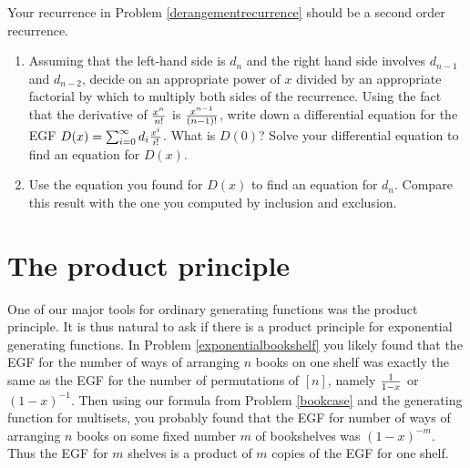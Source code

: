 \itemesi Your recurrence in  Problem \ref{derangementrecurrence}
should be a second order recurrence.\label{exponentialderangements}
\begin{enumerate}  
\item Assuming that the left-hand side is $d_n$ and the right hand side
involves $d_{n-1}$ and $d_{n-2}$, decide on an appropriate power of $x$
divided by an appropriate factorial by which to multiply both sides of
the recurrence.  Using the fact that the
derivative of $x^n\over n!$ is $x^{n-1}\over (n-1)!$, write down a
differential equation for the EGF $D(x) =
\sum_{i=0}^\infty d_i{x^i\over i!}$. What is $D(0)$?  Solve your
differential equation to find an equation for $D(x)$.
\item Use the equation you found for $D(x)$ to find an equation for
$d_n$.  Compare this result with the one you computed by inclusion and
exclusion. 
\end{enumerate}

\ep

\section{The product principle}  One of our major tools for ordinary
generating functions was the product principle.  It is thus natural to
ask if there is a product principle for exponential generating functions.
In Problem \ref{exponentialbookshelf} you likely found that the
EGF for the number of ways of arranging $n$
books on one shelf was exactly the same as the EGF for the number of
permutations of $[n]$, namely $1\over 1-x$ or
$(1-x)^{-1}$.  Then using our formula from Problem \ref{bookcase} and the
generating function for multisets, you probably found that the EGF for
number of ways of arranging $n$ books on some fixed number
$m$ of bookshelves was $(1-x)^{-m}$.  Thus the EGF for $m$ shelves is a
product of $m$ copies of the EGF for one
shelf. 

